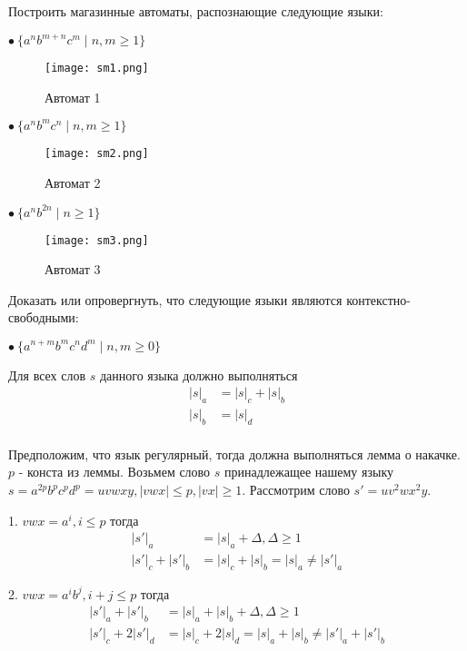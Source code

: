 \graphicspath{{img/}}

\begin{problem}
  Построить магазинные автоматы, распознающие следующие языки:
\end{problem}

$\bullet \: \{ a^nb^{m+n}c^m \mid n,m \geq 1 \}$
\begin{figure}[h]
  \texttt{[image: sm1.png]}
  \caption{Автомат 1}
\end{figure}

$\bullet \: \{ a^nb^mc^n \mid n,m \geq 1 \}$
\begin{figure}[h]
  \texttt{[image: sm2.png]}
  \caption{Автомат 2}
\end{figure}

$\bullet \: \{ a^nb^{2n} \mid n \geq 1 \}$
\begin{figure}[h]
  \texttt{[image: sm3.png]}
  \caption{Автомат 3}
\end{figure}

\break

\begin{problem}
  Доказать или опровергнуть, что следующие языки
  являются контекстно-свободными:
\end{problem}

$\bullet \: \{ a^{n+m}b^mc^nd^m \mid n, m \geq 0 \}$

Для всех слов $s$ данного языка должно выполняться
\begin{align*}
  |s|_a &= |s|_c + |s|_b \\
  |s|_b &= |s|_d \\
\end{align*}

Предположим, что язык регулярный, тогда должна выполняться лемма о накачке.
$p$ - конста из леммы.
Возьмем слово $s$ принадлежащее нашему языку $s = a^{2p}b^pc^pd^p = uvwxy, |vwx| \leq p, |vx| \geq 1$. 
Рассмотрим слово $s' = uv^2wx^2y$.

1. $vwx = a^i, i \leq p$ тогда
\begin{align*}
  |s'|_a &= |s|_a + \Delta, \Delta \geq 1 \\
  |s'|_c + |s'|_b &= |s|_c + |s|_b = |s|_a \neq |s'|_a
\end{align*}

2. $vwx = a^ib^j, i + j \leq p$ тогда
\begin{align*}
  |s'|_a + |s'|_b &= |s|_a + |s|_b + \Delta, \Delta \geq 1 \\
  |s'|_c + 2|s'|_d &= |s|_c + 2|s|_d = |s|_a + |s|_b \neq |s'|_a + |s'|_b
\end{align*}

